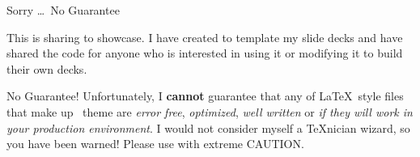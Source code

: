 \documentclass[\string~/GitHub/sthlmNordBeamerTheme/sthlmNordLightDemo.tex]{subfiles}
\begin{document}
\begin{frame}[c]{Sorry \ldots\ No Guarantee}

	This is sharing to showcase. I have created \snord to template my 
    slide decks and have shared the code for anyone who is interested in using it or modifying 
	it to build their own decks.  

	\vspace{1em}

	\begin{alertblock}{No Guarantee!}
		Unfortunately, I \textbf{cannot} guarantee that any of \LaTeX\ style files that make up
		\snord\ theme are \emph{error free}, \emph{optimized}, \emph{well written} or
		\emph{if they will work in your production environment}.  I would not consider
		myself a \TeX nician wizard, so you have been warned!  Please use with extreme
		\alert{CAUTION}.
	\end{alertblock}


\end{frame}
\end{document}

